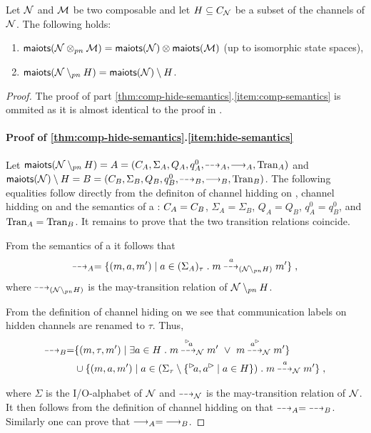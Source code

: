 \begin{theorem}\label{thm:comp-hide-semantics}
  Let $\mathcal{N}$ and $\mathcal{M}$ be two composable \MAIOPNs  and let $H \subseteq C_\mathcal{N}$
be a subset of the channels of $\mathcal{N}$. The following holds:
 \begin{enumerate}
\item\label{item:comp-semantics} 
$\mathsf{maiots}(\mathcal{N} \otimes_{pn} \mathcal{M}) = \mathsf{maiots}(\mathcal{N}) \otimes \mathsf{maiots}(\mathcal{M})$ (up to isomorphic state spaces),
\item\label{item:hide-semantics}
$\mathsf{maiots}(\mathcal{N} \setminus_{pn} H) = \mathsf{maiots}(\mathcal{N}) \setminus H$.
 \end{enumerate}
\end{theorem}
\begin{proof}
	The proof of part \ref{thm:comp-hide-semantics}.\ref{item:comp-semantics} is ommited as it is almost identical to the proof in \cite{TechReportVersion}.

\paragraph{Proof of \ref{thm:comp-hide-semantics}.\ref{item:hide-semantics}}
Let $\maiots(\pnN \hidepn H) = A = \maiotstup{A}$ and $\maiots(\pnN) \hide H = B = \maiotstup{B}$. 
The following equalities follow directly from 
the definiton of channel hidding on \MAIOPNs, channel hidding on \MAIOTSs and the semantics of a \MAIOPN: 
$C_A = C_B$, $\Sigma_A = \Sigma_B$, $Q_A = Q_B$, $q^0_A = q^0_B$, and $\mathrm{Tran}_A = \mathrm{Tran}_B$. 
It remains to prove that the two transition relations coincide.

From 
the semantics of a \MAIOPN
it follows that 
\[
    \may{}_A = \{(m,a,m') \mid a \in (\Sigma_A)_\tau \;.\; m \may{a}_{(\pnN \hidepn H)} m'\}\;,
\]
where $\may{}_{(\pnN \hidepn H)}$ is the may-transition relation of $\mathcal{N} \setminus_{pn} H$.

From the
definition of channel hiding on \MAIOPNs
we see that communication labels on hidden channels are renamed to $\tau$. Thus, 
\begin{align*}
    \may{}_B = &\{(m,\tau,m') \mid \exists a \in H \;.\; m \may{\inact{a}}_{\pnN} m' ~\vee~m \may{\outact{a}}_{\pnN} m' \}\\
    &\cup  \{(m,a,m') \mid a \in (\Sigmat \setminus \{\inact{a},\outact{a} \mid a \in H\}) \;.\; m \may{a}_{\pnN} m'\} \;,
\end{align*}

where $\Sigma$ is the I/O-alphabet of $\mathcal{N}$ and $\may{}_{\pnN}$ is the may-transition relation of $\mathcal{N}$.
It then follows from 
the definition of channel hidding on \MAIOTS
that $\may{}_A =~\may{}_B$. Similarly one can prove that $\must{}_A =~\must{}_B$.
\end{proof}